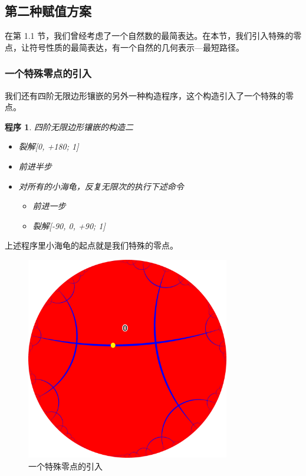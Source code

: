 \documentclass[a4paper,12pt]{article}
\newtheorem{program}{程序}
\begin{document}
\subsection{第二种赋值方案}

在第 1.1 节，我们曾经考虑了一个自然数的最简表达。在本节，我们引入特殊的零点，让符号性质的最简表达，有一个自然的几何表示—最短路径。

\subsubsection{一个特殊零点的引入}

我们还有四阶无限边形镶嵌的另外一种构造程序，这个构造引入了一个特殊的零点。

\begin{program}
四阶无限边形镶嵌的构造二
\begin{itemize}
\item 裂解[0, +180; 1]
\item 前进半步
\item 对所有的小海龟，反复无限次的执行下述命令
\begin{itemize}
  \item 前进一步
  \item 裂解[-90, 0, +90; 1]
\end{itemize}
\end{itemize}
\end{program}

上述程序里小海龟的起点就是我们特殊的零点。

\begin{figure}[ht]
\centering
\includegraphics[width=3.5in]{images/H2_tiling_with_zero_2.png}
\caption{一个特殊零点的引入}
\end{figure}
\end{document}
